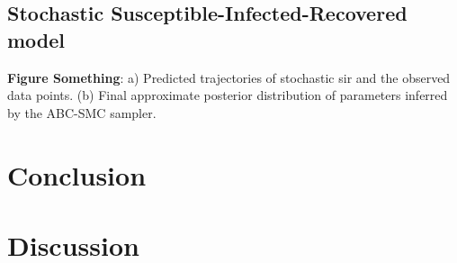 \documentclass[12pt]{article} %
\begin{document}
\subsection{Stochastic Susceptible-Infected-Recovered model}

\textbf{Figure Something}: a) Predicted trajectories of stochastic sir and the observed data points. (b) Final approximate posterior distribution of parameters inferred by the ABC-SMC sampler.




\section{Conclusion}
\section{Discussion}
\end{document}
